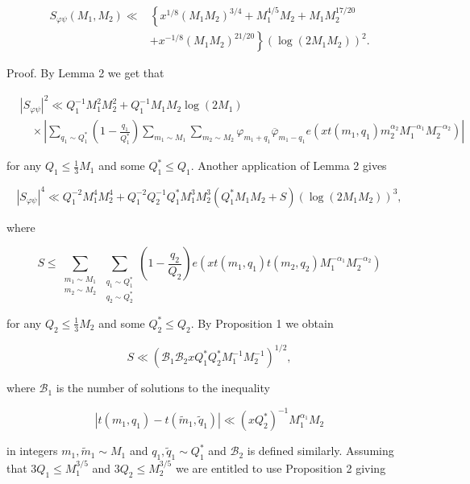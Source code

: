 \documentclass[10pt]{article}
\begin{document}
$$
\begin{aligned}
S_{\varphi \psi}\left(M_{1}, M_{2}\right)\ll & \left\{x^{1 / 8}\left(M_{1} M_{2}\right)^{3 / 4}+M_{1}^{4 / 5} M_{2}+M_{1} M_{2}^{17 / 20}\right. \\
& \left.+x^{-1 / 8}\left(M_{1} M_{2}\right)^{21 / 20}\right\}\left(\log\left(2 M_{1} M_{2}\right)\right)^{2} .
\end{aligned}
$$

Proof. By Lemma 2 we get that

$$
\begin{aligned}
& \left|S_{\varphi \psi}\right|^{2} \ll Q_{1}^{-1} M_{1}^{2} M_{2}^{2}+Q_{1}^{-1} M_{1} M_{2}\log(2 M_{1}) \\
& \quad\times\left|\sum_{q_{1} \sim Q_{1}^{*}}\left(1-\frac{q_{1}}{Q_{1}^{*}}\right) \sum_{m_{1} \sim M_{1}} \sum_{m_{2} \sim M_{2}} \varphi_{m_{1}+q_{1}} \overline{\varphi}_{m_{1}-q_{1}} e\left(x t\left(m_{1}, q_{1}\right) m_{2}^{\alpha_{2}} M_{1}^{-\alpha_{1}} M_{2}^{-\alpha_{2}}\right)\right|
\end{aligned}
$$

for any $Q_{1} \leqslant \frac{1}{3} M_{1}$ and some $Q_{1}^{*} \leqslant Q_{1}$. Another application of Lemma 2 gives

$$
\left|S_{\varphi \psi}\right|^{4} \ll Q_{1}^{-2} M_{1}^{4} M_{2}^{4}+Q_{1}^{-2} Q_{2}^{-1} Q_{1}^{*} M_{1}^{3} M_{2}^{3}\left(Q_{1}^{*} M_{1} M_{2}+S\right)\left(\log\left(2 M_{1} M_{2}\right)\right)^{3},
$$

where

$$
S \leqslant \sum_{\substack{m_{1} \sim M_{1} \\ m_{2} \sim M_{2}}} \sum_{\substack{q_{1} \sim Q_{1}^{*} \\ q_{2} \sim Q_{2}^{*}}}\left(1-\frac{q_{2}}{Q_{2}}\right) e\left(x t\left(m_{1}, q_{1}\right) t\left(m_{2}, q_{2}\right) M_{1}^{-\alpha_{1}} M_{2}^{-\alpha_{2}}\right)
$$

for any $Q_{2} \leqslant \frac{1}{3} M_{2}$ and some $Q_{2}^{*} \leqslant Q_{2}$. By Proposition 1 we obtain

$$
S \ll\left(\mathscr{B}_{1} \mathscr{B}_{2} x Q_{1}^{*} Q_{2}^{*} M_{1}^{-1} M_{2}^{-1}\right)^{1 / 2},
$$

where $\mathscr{B}_{1}$ is the number of solutions to the inequality

$$
\left|t\left(m_{1}, q_{1}\right)-t\left(\tilde{m}_{1}, \tilde{q}_{1}\right)\right| \ll\left(x Q_{2}^{*}\right)^{-1} M_{1}^{\alpha_{1}} M_{2}
$$

in integers $m_{1}, \tilde{m}_{1} \sim M_{1}$ and $q_{1}, \tilde{q}_{1} \sim Q_{1}^{*}$ and $\mathscr{B}_{2}$ is defined similarly. Assuming that $3 Q_{1} \leqslant M_{1}^{3 / 5}$ and $3 Q_{2} \leqslant M_{2}^{3 / 5}$ we are entitled to use Proposition 2 giving
\end{document}
